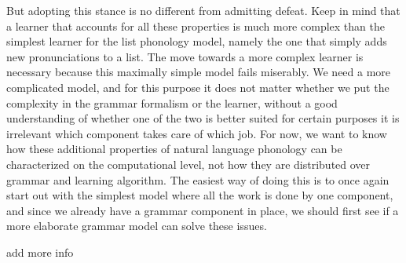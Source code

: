 But adopting this stance is no different from admitting defeat.
Keep in mind that a learner that accounts for all these properties is much more complex than the simplest learner for the list phonology model, namely the one that simply adds new pronunciations to a list.
The move towards a more complex learner is necessary because this maximally simple model fails miserably.
We need a more complicated model, and for this purpose it does not matter whether we put the complexity in the grammar formalism or the learner, without a good understanding of whether one of the two is better suited for certain purposes it is irrelevant which component takes care of which job.
For now, we want to know how these additional properties of natural language phonology can be characterized on the computational level, not how they are distributed over grammar and learning algorithm.
The easiest way of doing this is to once again start out with the simplest model where all the work is done by one component, and since we already have a grammar component in place, we should first see if a more elaborate grammar model can solve these issues. 



\begin{literature}
add more info
\end{literature}
